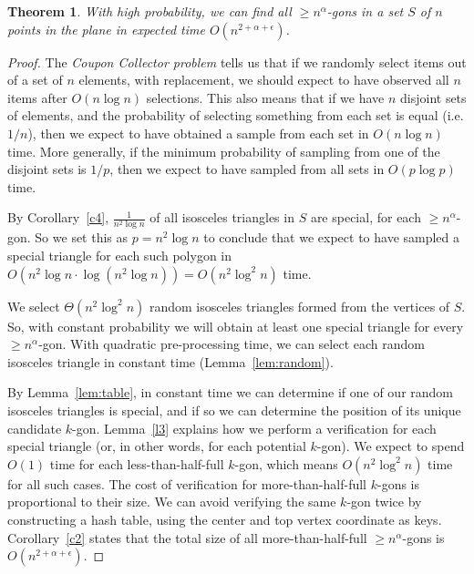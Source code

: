 \documentclass{article}
\newtheorem{theorem}{Theorem}
\begin{document}
\begin{theorem}
\label{big-gons}
With high probability, we can find all  ${\geq}n^\alpha$-gons in a set $S$ of $n$ points in the 
plane in expected time $O(n^{2{+}\alpha+\epsilon})$.
\end{theorem}

\begin{proof}
The {\em Coupon Collector problem} tells us that if we randomly select items out of a set of $n$ elements, with replacement, we should expect to have observed all $n$ items after $O(n\log n)$ selections.    This also means that if we have $n$ disjoint sets of elements, and the probability of selecting something from each set is
equal (i.e. $1/n$), then we expect to have obtained a sample from each set in $O(n\log n)$ time.
More generally,  if the minimum probability of sampling from one of the disjoint sets is
$1/p$, then we expect to have sampled from all sets in $O(p\log p)$ time.

By Corollary~\ref{c4},   $\frac{1}{n^2\log n}$ of all isosceles triangles in $S$ are
special, for each ${\geq}n^\alpha$-gon.
So we set this as $p=n^2\log n$ to conclude that we expect to have sampled a special triangle for each
such polygon in $O(n^2\log n\cdot\log(n^2\log n)) = O(n^2\log^2 n)$ time.

We select $\Theta(n^2 \log^2 n)$ random
isosceles triangles formed from the vertices of $S$. 
So, with  constant probability we will obtain at least one special triangle for every ${\geq}
n^{\alpha}$-gon. 
With quadratic pre-processing time,
we can select each random isosceles triangle in constant time (Lemma~\ref{lem:random}).

By Lemma~\ref{lem:table}, in constant time we can determine if one of our random isosceles triangles is
special, and if so we can determine the position of its unique candidate $k$-gon.
Lemma~\ref{l3} explains how we perform a verification for each special triangle (or, in other words,
for each potential $k$-gon).
We expect to spend $O(1)$ time  for each less-than-half-full $k$-gon, which means
$O(n^2 \log^2 n)$ time for all such cases. 
The cost of verification for more-than-half-full $k$-gons is proportional to their size.
We can avoid verifying the same $k$-gon twice by constructing a hash table, using the center
and top vertex coordinate as keys.
Corollary~\ref{c2} states that the total size of all
more-than-half-full ${\geq} n^{\alpha}$-gons is $O(n^{2{+}\alpha{+}\epsilon})$. 
\end{proof}
\end{document}
